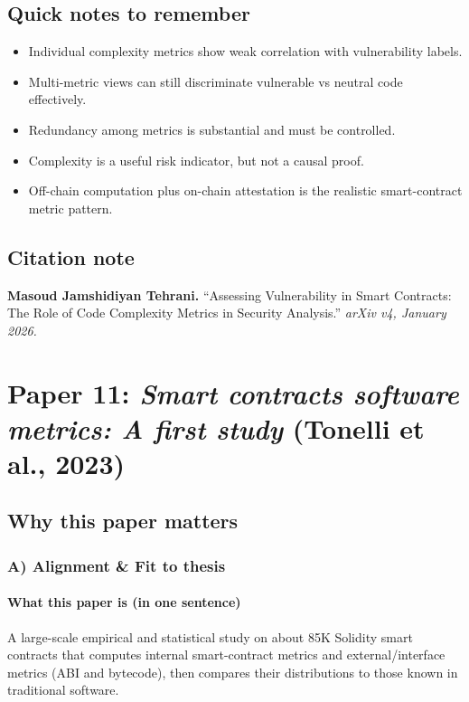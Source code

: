 \documentclass[11pt,a4paper]{article}
\begin{document}
\subsection{Quick notes to remember}
\begin{itemize}[leftmargin=*]
  \item Individual complexity metrics show weak correlation with vulnerability labels.
  \item Multi-metric views can still discriminate vulnerable vs neutral code effectively.
  \item Redundancy among metrics is substantial and must be controlled.
  \item Complexity is a useful risk indicator, but not a causal proof.
  \item Off-chain computation plus on-chain attestation is the realistic smart-contract metric pattern.
\end{itemize}

\subsection{Citation note}
\noindent\textbf{Masoud Jamshidiyan Tehrani.} ``Assessing Vulnerability in Smart Contracts: The Role of Code Complexity Metrics in Security Analysis.'' \textit{arXiv v4, January 2026.}

\newpage
\section{Paper 11: \textit{Smart contracts software metrics: A first study} (Tonelli et al., 2023)}

\subsection{Why this paper matters}
\subsubsection*{A) Alignment \& Fit to thesis}
\paragraph{What this paper is (in one sentence)}
A large-scale empirical and statistical study on about 85K Solidity smart contracts that computes internal smart-contract metrics and external/interface metrics (ABI and bytecode), then compares their distributions to those known in traditional software.
\end{document}
